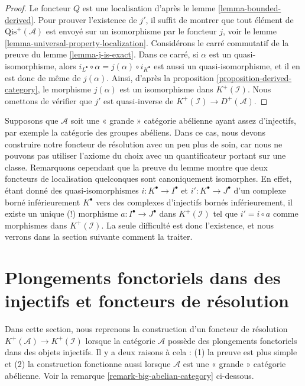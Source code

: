 \begin{proof}
Le foncteur $Q$ est une localisation d'après le
lemme \ref{lemma-bounded-derived}. Pour prouver l'existence de $j'$, il suffit
de montrer que tout élément de $\text{Qis}^{+}(\mathcal{A})$ est envoyé sur
un isomorphisme par le foncteur $j$, voir le
lemme \ref{lemma-universal-property-localization}.
Considérons le carré commutatif de la preuve du
lemme \ref{lemma-j-is-exact}. Dans ce carré, si $\alpha$ est un
quasi-isomorphisme, alors
$i_{L^\bullet}\circ\alpha=j(\alpha)\circ i_{K^\bullet}$ est aussi un
quasi-isomorphisme, et il en est donc de même de $j(\alpha)$. Ainsi, d'après
la proposition \ref{proposition-derived-category}, le morphisme $j(\alpha)$
est un isomorphisme dans $K^+(\mathcal{I})$. Nous omettons de vérifier que
$j'$ est quasi-inverse de
$K^{+}(\mathcal{I}) \to D^{+}(\mathcal{A})$.
\end{proof}

\begin{remark}
\label{remark-big-localization}
Supposons que $\mathcal{A}$ soit une « grande » catégorie abélienne ayant
assez d'injectifs, par exemple la catégorie des groupes abéliens. Dans ce cas,
nous devons construire notre foncteur de résolution avec un peu plus de soin,
car nous ne pouvons pas utiliser l'axiome du choix avec un quantificateur
portant sur une classe. Remarquons cependant que la preuve du lemme montre que
deux foncteurs de localisation quelconques sont canoniquement isomorphes. En
effet, étant donné des quasi-isomorphismes
$i : K^\bullet \to I^\bullet$ et $i' : K^\bullet \to J^\bullet$ d'un
complexe borné inférieurement $K^\bullet$ vers des complexes d'injectifs
bornés inférieurement, il existe un unique (!) morphisme
$a : I^\bullet \to J^\bullet$ dans $K^{+}(\mathcal{I})$ tel que
$i' = i \circ a$ comme morphismes dans $K^{+}(\mathcal{I})$. La seule
difficulté est donc l'existence, et nous verrons dans la section suivante
comment la traiter.
\end{remark}


\section{Plongements fonctoriels dans des injectifs et foncteurs de
résolution}
\label{section-functorial-injective-resolutions}

\noindent
Dans cette section, nous reprenons la construction d'un foncteur de résolution
$K^{+}(\mathcal{A}) \to K^{+}(\mathcal{I})$ lorsque la catégorie
$\mathcal{A}$ possède des plongements fonctoriels dans des objets injectifs.
Il y a deux raisons à cela : (1) la preuve est plus simple et (2) la
construction fonctionne aussi lorsque $\mathcal{A}$ est une « grande »
catégorie abélienne. Voir la remarque
\ref{remark-big-abelian-category} ci-dessous.

